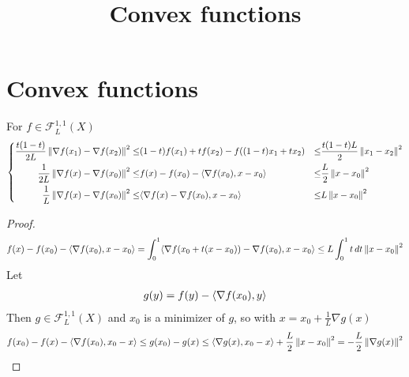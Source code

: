 \documentclass[12pt,english]{article}
\begin{document}

\title{Convex functions}
\author{}
\maketitle
\tableofcontents

%
\section{Convex functions}\label{sec:}
%
\begin{lemma}\label{lemma:}
%
For $f\in \mathcal F^{1,1}_{L}(X)$
%
\begin{equation}\label{eq:conv_lip}
%
\left\{
\begin{aligned}
\frac{t(1-t)}{2L}\norm{\nabla f(x_1)-\nabla f(x_2)}^2\le&(1-t) f(x_1) + t f(x_2) - f( (1-t)x_1 + t x_2) &\le& \frac{t(1-t)L}{2}\norm{x_1-x_2}^2\\
\frac{1}{2L} \norm{\nabla f(x)-\nabla f(x_0)}^2 \le& f(x) - f(x_0) - \scp{\nabla f(x_0)}{x-x_0} &\le& \frac{L}{2} \norm{x-x_0}^2\\
\frac1L \norm{\nabla f(x) -\nabla f(x_0)}^2\le& \scp{\nabla f(x) -\nabla f(x_0)}{x-x_0} &\le&  L \norm{x-x_0}^2
\end{aligned}
\right.
\end{equation}
%
\end{lemma}
%
%
\begin{proof}
%
\begin{align*}
f(x) - f(x_0) - \langle\nabla f(x_0),x-x_0\rangle = \int_0^1 \langle\nabla f(x_0+t(x-x_0))-\nabla f(x_0),x-x_0\rangle
\le L \int_0^1t\,dt \left\|x-x_0\right\|^2
\end{align*}
%
Let
%
\begin{align*}
g(y) = f(y) - \langle\nabla f(x_0),y\rangle
\end{align*}
%
Then $g\in \mathcal F^{1,1}_{L}(X)$ and $x_0$ is a minimizer of $g$, so with  $x=x_0+ \frac{1}{L}\nabla g(x)$
%
%
\begin{align*}
f(x_0) - f(x) -\langle\nabla f(x_0),x_0-x\rangle \le g(x_0) - g(x) \le  \langle\nabla g(x),x_0-x\rangle+\frac{L}{2} \left\|x-x_0\right\|^2
= -\frac{L}{2} \left\|\nabla g(x)\right\|^2
\end{align*}
%



\end{proof}
%
\end{document}
